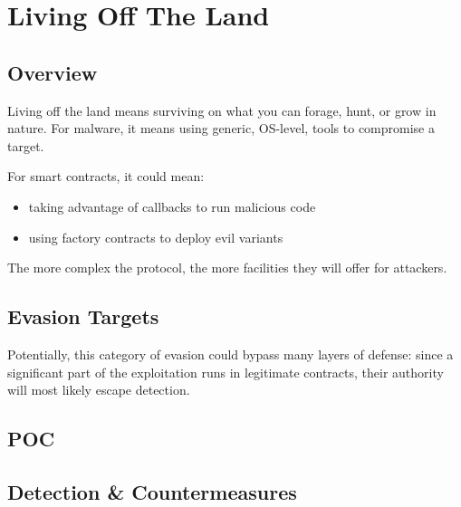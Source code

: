 \section{Living Off The Land} \label{sec:living-off-the-land}

\subsection{Overview}

Living off the land means surviving on what you can forage, hunt, or grow in nature.
For malware, it means using generic, OS-level, tools to compromise a target.

For smart contracts, it could mean:

\begin{itemize}
\item{taking advantage of callbacks to run malicious code}
\item{using factory contracts to deploy evil variants}
\end{itemize}

The more complex the protocol, the more facilities they will offer for attackers.

\subsection{Evasion Targets}

Potentially, this category of evasion could bypass many layers of defense:
since a significant part of the exploitation runs in legitimate contracts, their authority will most likely escape detection.

\subsection{POC}

\subsection{Detection \& Countermeasures}

